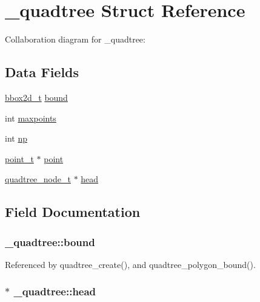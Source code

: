 \hypertarget{struct__quadtree}{}\section{\+\_\+quadtree Struct Reference}
\label{struct__quadtree}


Collaboration diagram for \+\_\+quadtree\+:
\subsection*{Data Fields}
\begin{DoxyCompactItemize}
\item 
\hyperlink{bbox2d_8h_a1c61505f6f1c486a673ba4547602b9df}{bbox2d\+\_\+t} \hyperlink{struct__quadtree_a28f83d0dfcf3bfba21c8135356b4829d}{bound}
\item 
int \hyperlink{struct__quadtree_a53848ad68be23762139a4137bef2f282}{maxpoints}
\item 
int \hyperlink{struct__quadtree_a429eeb0eb80c3dba555fd293ff4344f1}{np}
\item 
\hyperlink{delaunay2d_8c_a10113fa111734396b2066f3fa38c9584}{point\+\_\+t} $\ast$ \hyperlink{struct__quadtree_a2853d8425a718e2a294f6ccd9ddaecdb}{point}
\item 
\hyperlink{quadtree_8c_ad63e20da3252f1c7ac0ec1fb59ab1e61}{quadtree\+\_\+node\+\_\+t} $\ast$ \hyperlink{struct__quadtree_a94a70e5a2b37d359fc8d63ea81ebf76a}{head}
\end{DoxyCompactItemize}


\subsection{Field Documentation}
\subsubsection[{\texorpdfstring{bound}{bound}}]{ \+\_\+quadtree\+::bound}\hypertarget{struct__quadtree_a28f83d0dfcf3bfba21c8135356b4829d}{}\label{struct__quadtree_a28f83d0dfcf3bfba21c8135356b4829d}


Referenced by quadtree\+\_\+create(), and quadtree\+\_\+polygon\+\_\+bound().

\subsubsection[{\texorpdfstring{head}{head}}]{$\ast$ \+\_\+quadtree\+::head}\hypertarget{struct__quadtree_a94a70e5a2b37d359fc8d63ea81ebf76a}{}\label{struct__quadtree_a94a70e5a2b37d359fc8d63ea81ebf76a}


